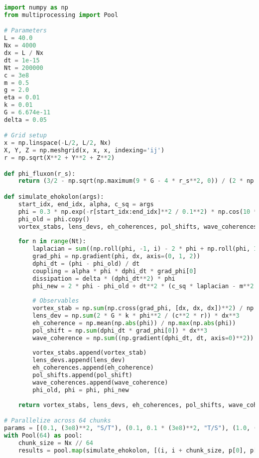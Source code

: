 \documentclass[11pt]{article}
\begin{document}
\begin{lstlisting}[language=Python, caption={Fluxonic Black Hole and Lensing Simulation}, label=lst:simulation]
import numpy as np
from multiprocessing import Pool

# Parameters
L = 40.0
Nx = 4000
dx = L / Nx
dt = 1e-15
Nt = 200000
c = 3e8
m = 0.5
g = 2.0
eta = 0.01
k = 0.01
G = 6.674e-11
delta = 0.05

# Grid setup
x = np.linspace(-L/2, L/2, Nx)
X, Y, Z = np.meshgrid(x, x, x, indexing='ij')
r = np.sqrt(X**2 + Y**2 + Z**2)

def phi_fluxon(r_s):
    return (3/2 - np.sqrt(np.maximum(9 * G - 4 * r_s**2, 0)) / (2 * np.sqrt(G))) * r_s

def simulate_ehokolon(args):
    start_idx, end_idx, alpha, c_sq = args
    phi = 0.3 * np.exp(-r[start_idx:end_idx]**2 / 0.1**2) * np.cos(10 * X[start_idx:end_idx]) + 0.1 * np.random.rand(Nx//64, Nx, Nx)
    phi_old = phi.copy()
    vortex_stabs, lens_devs, eh_coherences, pol_shifts, wave_coherences = [], [], [], [], []
    
    for n in range(Nt):
        laplacian = sum((np.roll(phi, -1, i) - 2 * phi + np.roll(phi, 1, i)) / dx**2 for i in range(3))
        grad_phi = np.gradient(phi, dx, axis=(0, 1, 2))
        dphi_dt = (phi - phi_old) / dt
        coupling = alpha * phi * dphi_dt * grad_phi[0]
        dissipation = delta * (dphi_dt**2) * phi
        phi_new = 2 * phi - phi_old + dt**2 * (c_sq * laplacian - m**2 * phi - g * phi**3 - eta * phi**5 + 8 * np.pi * G * k * phi**2 + coupling - dissipation)
        
        # Observables
        vortex_stab = np.sum(np.cross(grad_phi, [dx, dx, dx])**2) / np.sum(grad_phi**2) * dx**3
        lens_dev = np.sum(2 * G * k * phi**2 / (c**2 * r)) * dx**3
        eh_coherence = np.mean(np.abs(phi)) / np.max(np.abs(phi))
        pol_shift = np.sum(dphi_dt * grad_phi[0]) * dx**3
        wave_coherence = np.sum((np.gradient(dphi_dt, dt, axis=0)**2)) / np.sum(dphi_dt**2) * dx**3
        
        vortex_stabs.append(vortex_stab)
        lens_devs.append(lens_dev)
        eh_coherences.append(eh_coherence)
        pol_shifts.append(pol_shift)
        wave_coherences.append(wave_coherence)
        phi_old, phi = phi, phi_new
    
    return vortex_stabs, lens_devs, eh_coherences, pol_shifts, wave_coherences

# Parallelize across 64 chunks
params = [(0.1, (3e8)**2, "S/T"), (0.1, 0.1 * (3e8)**2, "T/S"), (1.0, (3e8)**2, "S=T")]
with Pool(64) as pool:
    chunk_size = Nx // 64
    results = pool.map(simulate_ehokolon, [(i, i + chunk_size, p[0], p[1]) for i in range(0, Nx, chunk_size) for p in params])
\end{lstlisting}
\end{document}

